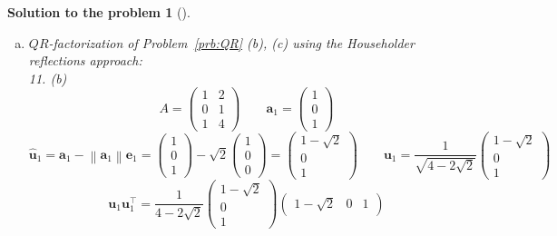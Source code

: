 \documentclass[12pt,a4]{article}
\newtheorem{solution}{Solution to the problem}
\newcommand{\ba}{{\mathbf a}}
\newcommand{\be}{{\mathbf e}}
\newcommand{\bu}{{\mathbf u}}
\newcommand{\bx}{{\mathbf x}}
\newcommand{\norm}[1]{\left\lVert#1\right\rVert}
\begin{document}
\begin{solution}[]
\begin{enumerate}[(a)]
\[
A = 
\begin{pmatrix}
1 & -1 \\
2 & 3
\end{pmatrix}
\]
Since $\bx = \ba_1$, $Q_\bu$ is thus the result of the first iteration of QR factorization using the Householder reflections and:
\[
Q_{\bu}A =
\begin{pmatrix} \sqrt 5 & \sqrt 5 \\ 0 & - \sqrt 5 \end{pmatrix}
\]
give us the first row $\begin{pmatrix} \sqrt 5 & \sqrt 5 \end{pmatrix}$ of the $R$ matrix . 
\item $QR$-factorization of Problem~\ref{prb:QR} (b), (c) using the Householder reflections approach: \\
11. (b)
\[
A =
\begin{pmatrix}
1 & 2 \\
0 & 1 \\
1 & 4 \end{pmatrix}
\qquad
\ba_1 = \begin{pmatrix} 1 \\ 0  \\ 1  \end{pmatrix}
\]
\[
\hat \bu_1 = \ba_1 - \norm{\ba_1} \be_1 = 
\begin{pmatrix} 1 \\ 0  \\ 1  \end{pmatrix}
-
\sqrt 2
\begin{pmatrix} 1 \\ 0  \\ 0  \end{pmatrix}
=
\begin{pmatrix} 1 - \sqrt 2 \\ 0  \\ 1  \end{pmatrix}
\qquad
\bu_1 =
\frac{1}{\sqrt{4 - 2\sqrt 2}}
\begin{pmatrix} 1 - \sqrt 2 \\ 0  \\ 1  \end{pmatrix}
\]
\[
\bu_1\bu_1^\top = 
\frac{1}{4 - 2\sqrt 2}
\begin{pmatrix} 1 - \sqrt 2 \\ 0  \\ 1  \end{pmatrix}
\begin{pmatrix} 1 - \sqrt 2 & 0  & 1  \end{pmatrix}
\]
\end{enumerate}
\end{solution}
\end{document}
